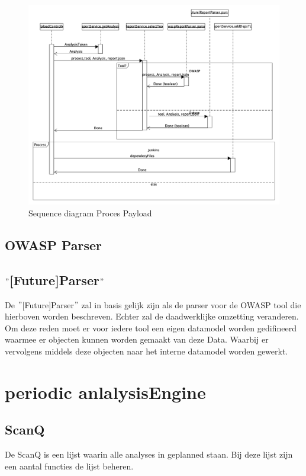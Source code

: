 \begin{figure}[bth]
    \myfloatalign
    \includegraphics[width=14cm]{gfx/umlet/exports/SeqProcessPayload}
    \caption{Sequence diagram Proces Payload}
    \label{fig:ProcesPayload}
\end{figure}

\subsection{OWASP Parser}\label{subsec:owasp-parser}

\subsection{$"$[Future]Parser$"$}\label{subsec:$"$[future]parser$"$}
De $"$[Future]Parser$"$ zal in basis gelijk zijn als de parser voor de OWASP tool die hierboven worden beschreven. Echter zal de daadwerklijke omzetting veranderen. Om deze reden moet er voor iedere tool een eigen datamodel worden gedifineerd waarmee er objecten kunnen worden gemaakt van deze Data. Waarbij er vervolgens middels deze objecten naar het interne datamodel worden gewerkt.






\section{periodic anlalysisEngine}

\subsection{ScanQ}
De ScanQ is een lijst waarin alle analyses in geplanned staan. Bij deze lijst zijn een aantal functies de lijst beheren.


